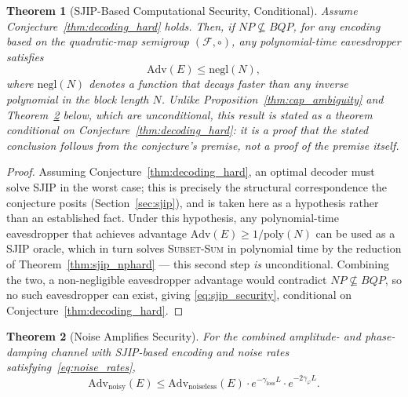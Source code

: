\documentclass[journal,twocolumn]{IEEEtran}
\theoremstyle{definition}
\theoremstyle{plain}
\newtheorem{theorem}{Theorem}[section]
\begin{document}
\begin{theorem}[SJIP-Based Computational Security, Conditional]
\label{thm:sjip_security}
Assume Conjecture~\ref{thm:decoding_hard} holds. Then, if $NP
\not\subseteq BQP$, for any encoding based on the quadratic-map
semigroup $(\mathcal{F}, \circ)$, any polynomial-time eavesdropper
satisfies
\begin{equation}
  \mathrm{Adv}(E) \le \mathrm{negl}(N),
  \label{eq:sjip_security}
\end{equation}
where $\mathrm{negl}(N)$ denotes a function that decays faster
than any inverse polynomial in the block length $N$. Unlike
Proposition~\ref{thm:cap_ambiguity} and
Theorem~\ref{thm:noise_security} below, which are unconditional,
this result is stated as a theorem \emph{conditional on}
Conjecture~\ref{thm:decoding_hard}: it is a proof that the stated
conclusion follows from the conjecture's premise, not a proof of the
premise itself.
\end{theorem}

\begin{proof}
Assuming Conjecture~\ref{thm:decoding_hard}, an optimal decoder must
solve SJIP in the worst case; this is precisely the structural
correspondence the conjecture posits (Section~\ref{sec:sjip}), and is
taken here as a hypothesis rather than an established fact. Under
this hypothesis, any polynomial-time eavesdropper that achieves
advantage $\mathrm{Adv}(E) \ge 1/\mathrm{poly}(N)$ can be used as a
SJIP oracle, which in turn solves \textsc{Subset-Sum} in polynomial
time by the reduction of Theorem~\ref{thm:sjip_nphard} --- this
second step \emph{is} unconditional. Combining the two, a
non-negligible eavesdropper advantage would contradict $NP
\not\subseteq BQP$, so no such eavesdropper can exist, giving
\eqref{eq:sjip_security}, conditional on Conjecture~\ref{thm:decoding_hard}.
\end{proof}

\begin{theorem}[Noise Amplifies Security]
\label{thm:noise_security}
For the combined amplitude- and phase-damping channel with
SJIP-based encoding and noise rates satisfying~\eqref{eq:noise_rates},
\begin{equation}
  \mathrm{Adv}_{\mathrm{noisy}}(E) \le
  \mathrm{Adv}_{\mathrm{noiseless}}(E)\cdot
  e^{-\gamma_{\mathrm{loss}}L}\cdot e^{-2\gamma_\varphi L}.
  \label{eq:noise_security}
\end{equation}
\end{theorem}
\end{document}
